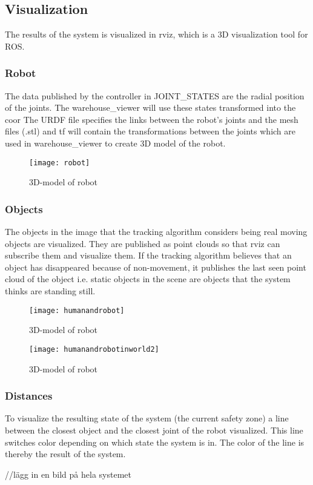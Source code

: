 \subsection{Visualization}

The results of the system is visualized in rviz, which is a 3D visualization tool for ROS. 

\subsubsection{Robot}
The data published by the controller in JOINT\_STATES are the radial position of the joints. The warehouse\_viewer will use these states transformed into the coor The URDF file specifies the links between the robot’s joints and the mesh files (.stl) and tf will contain the transformations between the joints which are used in warehouse\_viewer to create 3D model of the robot. 

\begin{figure}[H]
\begin{center}
\texttt{[image: robot]}
\caption{3D-model of robot}
\label{tracking}
\end{center}
\end{figure}

\subsubsection{Objects}
The objects in the image that the tracking algorithm considers being real moving objects are visualized. They are published as point clouds so that rviz can subscribe them and visualize them. If the tracking algorithm believes that an object has disappeared because of non-movement, it publishes the last seen point cloud of the object i.e. static objects in the scene are objects that the system thinks are standing still. 

\begin{figure}[H]
\begin{center}
\texttt{[image: humanandrobot]}
\caption{3D-model of robot}
\label{tracking}
\end{center}
\end{figure}

\begin{figure}[H]
\begin{center}
\texttt{[image: humanandrobotinworld2]}
\caption{3D-model of robot}
\label{tracking}
\end{center}
\end{figure}  

\subsubsection{Distances}
To visualize the resulting state of the system (the current safety zone) a line between the closest object and the closest joint of the robot visualized. This line switches color depending on which state the system is in. The color of the line is thereby the result of the system. 

//lägg in en bild på hela systemet

